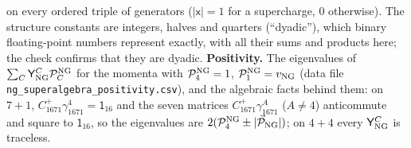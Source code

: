 \documentclass[
  10pt,
]{article}
\begin{document}
on every ordered triple of generators (\(\lvert\mathsf x\rvert=1\) for a
supercharge, 0 otherwise). The structure constants are integers, halves
and quarters (``dyadic''), which binary floating-point numbers represent
exactly, with all their sums and products here; the check confirms that
they are dyadic. \textbf{Positivity.} The eigenvalues of
\(\sum_C\mathsf Y^C_{\rm NG}\mathcal P^{\rm NG}_C\) for the momenta with
\(\mathcal P^{\rm NG}_4=1\), \(\mathcal P^{\rm NG}_1=v_{\rm NG}\) (data
file \texttt{ng\_superalgebra\_positivity.csv}), and the algebraic facts
behind them: on \(7+1\), \(C^+_{1671}\gamma^4_{1671}=\mathsf 1_{16}\)
and the seven matrices \(C^+_{1671}\gamma^A_{1671}\) (\(A\ne4\))
anticommute and square to \(\mathsf 1_{16}\), so the eigenvalues are
\(2(\mathcal P^{\rm NG}_4\pm\lvert\vec{\mathcal P}_{\rm NG}\rvert)\); on
\(4+4\) every \(\mathsf Y^C_{\rm NG}\) is traceless.
\end{document}
